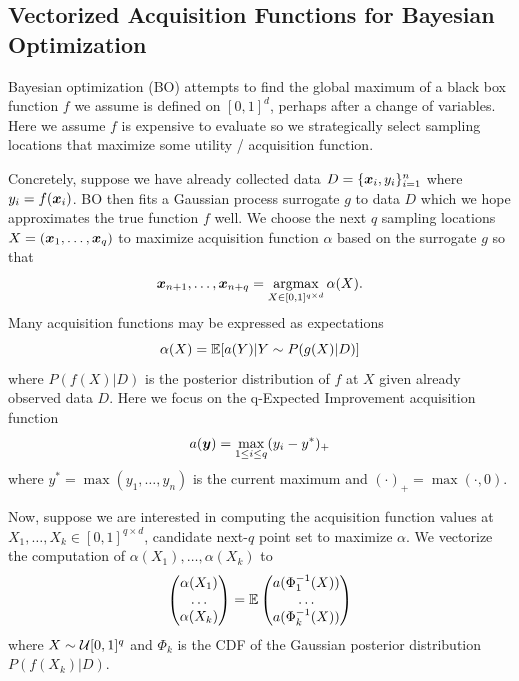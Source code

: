 \documentclass{article}[12pt]
\begin{document}



\subsection{Vectorized Acquisition Functions for Bayesian Optimization}

Bayesian optimization (BO) attempts to find the global maximum of a black box function $f$ we assume is defined on $[0,1]^d$, perhaps after a change of variables. Here we assume $f$ is expensive to evaluate so we strategically select sampling locations that maximize some utility / acquisition function. 

Concretely, suppose we have already collected data $D=\{\boldsymbol{x}_i,y_i\}_{i=1}^n$ where $y_i = f(\boldsymbol{x}_i)$. BO then fits a Gaussian process surrogate $g$ to data $D$ which we hope approximates the true function $f$ well. We choose the next $q$ sampling locations $X= (\boldsymbol{x}_1,\dots,\boldsymbol{x}_q)$ to maximize acquisition function $\alpha$ based on the surrogate $g$ so that 
$$\boldsymbol{x}_{n+1},\dots,\boldsymbol{x}_{n+q} = \operatorname*{argmax}_{X \in [0,1]^{q \times d}}\alpha(X).$$
Many acquisition functions may be expressed as expectations
$$\alpha(X) = \mathbb{E}[a(Y) | Y \sim P(g(X)|D)]$$ %
where $P(f(X)|D)$ is the posterior distribution of $f$ at $X$ given already observed data $D$. Here we focus on the q-Expected Improvement acquisition function
$$a(\boldsymbol{y}) = \max_{1 \leq i \leq q} (y_i - y^*)_+$$
where $y^*= \max(y_1,\dots,y_n)$ is the current maximum and $(\cdot)_+ = \max(\cdot,0)$. 

Now, suppose we are interested in computing the acquisition function values at $X_1,\dots,X_k \in [0,1]^{q \times d}$, candidate next-$q$ point set to maximize $\alpha$. We vectorize the computation of $\alpha(X_1),\dots,\alpha(X_k)$ to
\begin{equation}
    \begin{pmatrix} \alpha(X_1) \\ \dots \\ \alpha(X_k)\end{pmatrix} = \mathbb{E}\begin{pmatrix}a(\Phi_1^{-1}(X)) \\ \dots \\ a(\Phi_k^{-1}(X))\end{pmatrix}
    \label{eq:qei_vec}
\end{equation}
where $X \sim \mathcal{U}[0,1]^{q}$ and $\Phi_k$ is the CDF of the Gaussian posterior distribution $P(f(X_k)|D)$. 
\end{document}
